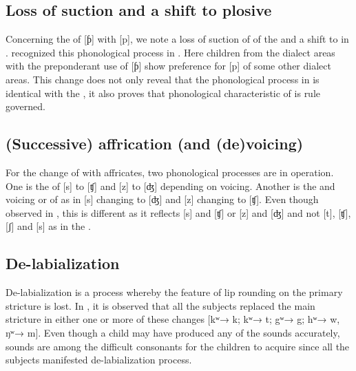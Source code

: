 \documentclass[output=paper,
modfonts
]{langscibook}
\begin{document}
\subsection{Loss of suction and a shift to plosive}\label{sec:alerechi:1.10}

Concerning the  of [ƥ] with [p], we note a loss of suction of  of the  and a shift to  in . \citet[260]{Alerechi2007a} recognized this phonological process in . Here children from the dialect areas with the preponderant use of [ƥ] show preference for [p] of some other dialect areas. This change does not only reveal that the phonological process in  is identical with the , it also proves that phonological  characteristic of  is rule governed.

\subsection{(Successive) affrication (and (de)voicing)}\label{sec:alerechi:1.11}

For the change of  with affricates, two phonological processes are in operation. One is the  of [s] to [ʧ] and [z] to [ʤ] depending on voicing. Another is the  and voicing or  of  as in [s] changing to [ʤ] and [z] changing to [ʧ]. Even though \citet[261]{Alerechi2007a} observed  in , this  is different as it reflects [s] and [ʧ] or [z] and [ʤ] and not [t], [ʧ], [ʃ] and [s] as in the .

\subsection{De-labialization}\label{sec:alerechi:1.12}

De-labialization is a process whereby the feature of lip rounding on the primary stricture is lost. In , it is observed that all the subjects replaced the main stricture in either one or more of these changes [kʷ→ k; kʷ→ t; gʷ→ g; hʷ→ w, ŋʷ→ m]. Even though a child may have produced any of the  sounds accurately,  sounds are among the difficult consonants for the children to acquire since all the subjects manifested de-labialization process. 
\end{document}
